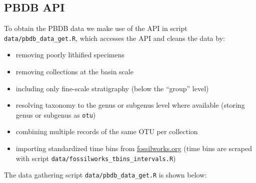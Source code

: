 \documentclass[]{article}
\providecommand{\tightlist}{%
  \setlength{\itemsep}{0pt}\setlength{\parskip}{0pt}}
\begin{document}
\subsection{PBDB API}\label{pbdb-api}

To obtain the PBDB data we make use of the API in script
\texttt{data/pbdb\_data\_get.R}, which accesses the API and cleans the
data by:

\begin{itemize}
\tightlist
\item
  removing poorly lithified specimens
\item
  removing collections at the basin scale
\item
  including only fine-scale stratigraphy (below the ``group'' level)
\item
  resolving taxonomy to the genus or subgenus level where available
  (storing genus or subgenus as \texttt{otu})
\item
  combining multiple records of the same OTU per collection
\item
  importing standardized time bins from \url{fossilworks.org} (time bins
  are scraped with script \texttt{data/fossilworks\_tbins\_intervals.R})
\end{itemize}

The data gathering script \texttt{data/pbdb\_data\_get.R} is shown
below:
\end{document}
